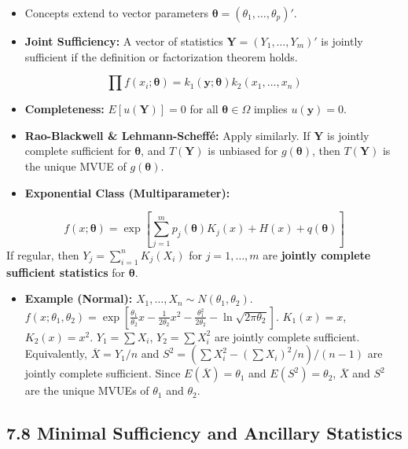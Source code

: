 \begin{itemize}
	\item Concepts extend to vector parameters $\boldsymbol{\theta} = (\theta_1, \dots, \theta_p)'$.
	\item \textbf{Joint Sufficiency:} A vector of statistics $\mathbf{Y} = (Y_1, \dots, Y_m)'$ is jointly sufficient if the definition or factorization theorem holds.
\end{itemize}
\[
\prod f(x_i; \boldsymbol{\theta}) = k_1(\mathbf{y}; \boldsymbol{\theta}) k_2(x_1, \dots, x_n)
\]
\begin{itemize}
	\item \textbf{Completeness:} $E[u(\mathbf{Y})] = 0$ for all $\boldsymbol{\theta} \in \Omega$ implies $u(\mathbf{y}) = 0$.
	\item \textbf{Rao-Blackwell \& Lehmann-Scheffé:} Apply similarly. If $\mathbf{Y}$ is jointly complete sufficient for $\boldsymbol{\theta}$, and $T(\mathbf{Y})$ is unbiased for $g(\boldsymbol{\theta})$, then $T(\mathbf{Y})$ is the unique MVUE of $g(\boldsymbol{\theta})$.
	\item \textbf{Exponential Class (Multiparameter):}
\end{itemize}
\[
f(x; \boldsymbol{\theta}) = \exp\left[ \sum_{j=1}^m p_j(\boldsymbol{\theta}) K_j(x) + H(x) + q(\boldsymbol{\theta}) \right]
\]
If regular, then $Y_j = \sum_{i=1}^n K_j(X_i)$ for $j=1, \dots, m$ are \textbf{jointly complete sufficient statistics} for $\boldsymbol{\theta}$.

\begin{itemize}
	\item \textbf{Example (Normal):} $X_1, \dots, X_n \sim N(\theta_1, \theta_2)$.
$f(x; \theta_1, \theta_2) = \exp\left[ \frac{\theta_1}{\theta_2} x - \frac{1}{2\theta_2} x^2 - \frac{\theta_1^2}{2\theta_2} - \ln\sqrt{2\pi\theta_2} \right]$.
$K_1(x) = x$, $K_2(x) = x^2$.
$Y_1 = \sum X_i$, $Y_2 = \sum X_i^2$ are jointly complete sufficient.
Equivalently, $\overline{X} = Y_1/n$ and $S^2 = (\sum X_i^2 - (\sum X_i)^2/n)/(n-1)$ are jointly complete sufficient.
Since $E(\overline{X}) = \theta_1$ and $E(S^2) = \theta_2$, $\overline{X}$ and $S^2$ are the unique MVUEs of $\theta_1$ and $\theta_2$.
\end{itemize}

\subsection{7.8 Minimal Sufficiency and Ancillary Statistics}

